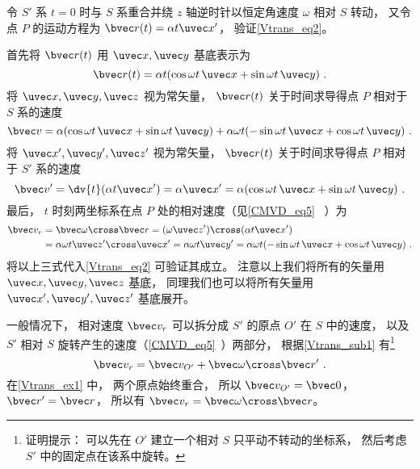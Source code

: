 \begin{example}{}\label{Vtrans_ex1}
令 $S'$ 系 $t = 0$ 时与 $S$ 系重合并绕 $z$ 轴逆时针以恒定角速度 $\omega$ 相对 $S$ 转动， 又令点 $P$ 的运动方程为 $\bvec r(t) = \alpha t \uvec x'$， 验证\autoref{Vtrans_eq2}。

首先将 $\bvec r(t)$ 用 $\uvec x, \uvec y$ 基底表示为
\begin{equation}
\bvec r(t) = \alpha t (\cos\omega t\, \uvec x + \sin\omega t\, \uvec y)~.
\end{equation}
将 $\uvec x, \uvec y, \uvec z$ 视为常矢量， $\bvec r(t)$ 关于时间求导得点 $P$ 相对于 $S$ 系的速度
\begin{equation}
\bvec v = \alpha (\cos\omega t \,\uvec x + \sin\omega t \,\uvec y)
+ \alpha\omega t (-\sin\omega t \,\uvec x + \cos\omega t \,\uvec y)~.
\end{equation}
将 $\uvec x', \uvec y', \uvec z'$ 视为常矢量， $\bvec r(t)$ 关于时间求导得点 $P$ 相对于 $S'$ 系的速度
\begin{equation}
\bvec v' = \dv{t} (\alpha t \uvec x') = \alpha \uvec x' = \alpha (\cos\omega t\, \uvec x + \sin\omega t \,\uvec y)~.
\end{equation}
最后， $t$ 时刻两坐标系在点 $P$ 处的相对速度（见\autoref{CMVD_eq5}~ ）为
\begin{equation}\label{Vtrans_eq3}
\begin{aligned}
\bvec v_r &= \bvec\omega \cross \bvec r = (\omega \uvec z') \cross (\alpha t \uvec x') \\
&= \alpha\omega t \uvec z'\cross\uvec x' = \alpha\omega t \uvec y' = \alpha\omega t(-\sin \omega t \,\uvec x + \cos\omega t \,\uvec y)~.
\end{aligned}\end{equation}
将以上三式代入\autoref{Vtrans_eq2} 可验证其成立。 注意以上我们将所有的矢量用 $\uvec x, \uvec y, \uvec z$ 基底， 同理我们也可以将所有矢量用 $\uvec x', \uvec y', \uvec z'$ 基底展开。
\end{example}

一般情况下， 相对速度 $\bvec v_r$ 可以拆分成 $S'$ 的原点 $O'$ 在 $S$ 中的速度， 以及 $S'$ 相对 $S$ 旋转产生的速度（\autoref{CMVD_eq5}~）两部分， 根据\autoref{Vtrans_sub1} 有\footnote{证明提示： 可以先在 $O'$ 建立一个相对 $S$ 只平动不转动的坐标系， 然后考虑 $S'$ 中的固定点在该系中旋转。}
\begin{equation}\label{Vtrans_eq4}
\bvec v_r = \bvec v_{O'} + \bvec \omega \cross \bvec r'~.
\end{equation}
在\autoref{Vtrans_ex1} 中， 两个原点始终重合， 所以 $\bvec v_{O'} = \bvec 0$， $\bvec r' = \bvec r$， 所以有 $\bvec v_r = \bvec\omega \cross \bvec r$。


